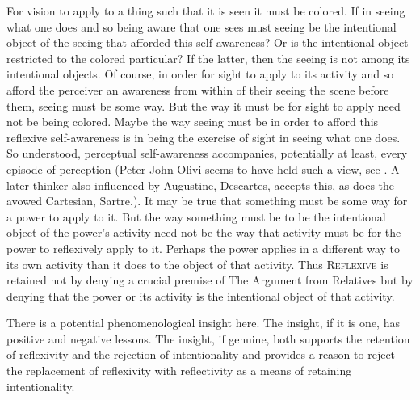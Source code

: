 For vision to apply to a thing such that it is seen it must be colored. If in seeing what one does and so being aware that one sees must seeing be the intentional object of the seeing that afforded this self-awareness? Or is the intentional object restricted to the colored particular? If the latter, then the seeing is not among its intentional objects. Of course, in order for sight to apply to its activity and so afford the perceiver an awareness from within of their seeing the scene before them, seeing must be some way. But the way it must be for sight to apply need not be being colored. Maybe the way seeing must be in order to afford this reflexive self-awareness is in being the exercise of sight in seeing what one does. So understood, perceptual self-awareness accompanies, potentially at least, every episode of perception (Peter John Olivi seems to have held such a view, see \citealt{Brower-Toland:2024qa}. A later thinker also influenced by Augustine, Descartes, accepts this, as does the avowed Cartesian, Sartre.). It may be true that something must be some way for a power to apply to it. But the way something must be to be the intentional object of the power's activity need not be the way that activity must be for the power to reflexively apply to it. Perhaps the power applies in a different way to its own activity than it does to the object of that activity. Thus \textsc{Reflexive} is retained not by denying a crucial premise of The Argument from Relatives but by denying that the power or its activity is the intentional object of that activity.

There is a potential phenomenological insight here. The insight, if it is one, has positive and negative lessons. The insight, if genuine, both supports the retention of reflexivity and the rejection of intentionality and provides a reason to reject the replacement of reflexivity with reflectivity as a means of retaining intentionality. 

